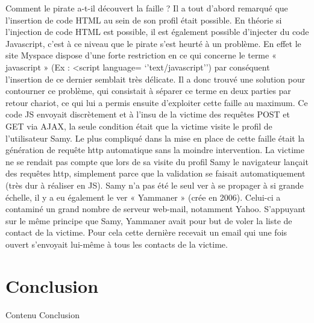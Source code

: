\documentclass[a4paper,12pt]{report}
\begin{document}
Comment le pirate a-t-il découvert la faille ?
Il a tout d’abord remarqué que l’insertion de code HTML au sein de son profil était possible. En théorie si l’injection de code HTML est possible, il est également possible d’injecter du code Javascript, c’est à ce niveau que le pirate s’est heurté à un problème. En effet le site Myspace dispose d’une forte restriction en ce qui concerne le terme « javascript » (Ex : <script language= ‘’text/javascript’’) par conséquent l’insertion de ce dernier semblait très délicate. Il a donc trouvé une solution pour contourner ce problème, qui consistait à séparer ce terme en deux parties par retour chariot, ce qui lui a permis ensuite d’exploiter cette faille au maximum.
Ce code JS envoyait discrètement et à l’insu de la victime des requêtes POST et GET via AJAX, la seule condition était que la victime visite le profil de l’utilisateur Samy. Le plus compliqué dans la mise en place de cette faille était la génération de requête http automatique sans la moindre intervention. La victime ne se rendait pas compte que lors de sa visite du profil Samy le navigateur lançait des requêtes http, simplement parce que la validation se faisait automatiquement (très dur à réaliser en JS).
Samy n’a pas été le seul ver à se propager à si grande échelle, il y a eu également le ver « Yammaner » (crée en 2006). Celui-ci a contaminé un grand nombre de serveur web-mail, notamment Yahoo. S’appuyant sur le même principe que Samy, Yammaner avait pour but de voler la liste de contact de la victime. Pour cela cette dernière recevait un email qui une fois ouvert s’envoyait lui-même à tous les contacts de la victime.
		

		\newpage
	
	\chapter*{Conclusion} %
		Contenu Conclusion

		\newpage
	
	\renewcommand\glossaryname{Glossaire}
	\printglossaries
	\newpage
	
	\nocite{*}		
	\newpage
	
	\listoffigures
	\newpage
	
\end{document}
